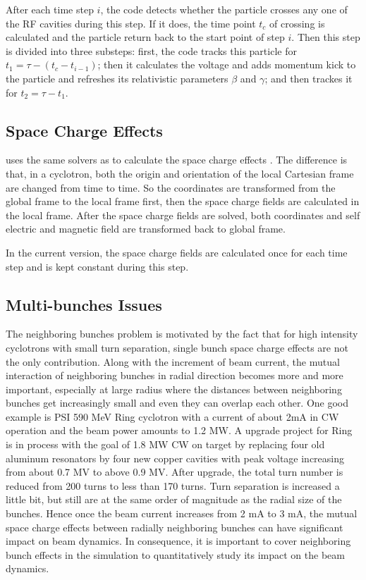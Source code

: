After each time step $i$, the code detects whether the particle crosses any one of the RF cavities during this step.
If it does, the time point $t_c$ of crossing is calculated and the particle return back to the start point of
step $i$. Then this step is divided into three substeps:
first, the code tracks this particle for $ t_1 = \tau - (t_c-t_{i-1})$;
then it calculates the voltage and adds momentum kick to the particle and refreshes its relativistic parameters $\beta$ and $\gamma$;
and then trackes it for $t_2 = \tau - t_1$.

\subsection{Space Charge Effects}

\opalcycl uses the same solvers as \opalt to calculate the space charge effects .
The difference is that, in a cyclotron,
both the origin and orientation of the local Cartesian frame are changed from time to time. So the coordinates are transformed from
the global frame to the local frame first, then the space charge fields are calculated in the local frame.
After the space charge fields are solved, both coordinates and self electric and magnetic field are transformed back to global frame.

In the current version, the space charge fields are calculated once for each time step and is kept constant during this step.

\subsection{Multi-bunches Issues}
\label{sec:opalcycl:MultiBunch}

The neighboring bunches problem is motivated by the fact that for high intensity cyclotrons with small turn
separation, single bunch space charge effects are not the only contribution. Along with the increment of beam
current, the mutual interaction of neighboring bunches in radial direction becomes more and more important,
especially at large radius where the distances between neighboring bunches get increasingly small and even they
can overlap each other. One good example is PSI 590 MeV Ring cyclotron with a current of about 2mA in
CW operation and the beam power amounts to 1.2 MW. A upgrade project for Ring is in process with
the goal of 1.8 MW CW on target by replacing four old aluminum resonators by four new copper cavities with peak
voltage increasing from about 0.7 MV to above 0.9 MV. After upgrade, the total turn
number is reduced from 200 turns to less than 170 turns.
Turn separation is increased a little bit, but still are at the same order
of magnitude as the radial size of the bunches. Hence once the beam current increases from 2 mA to 3 mA, the mutual space
charge effects between radially neighboring bunches can have significant impact on beam dynamics.
In consequence, it is important to cover neighboring bunch effects in the simulation to quantitatively study its impact on the beam dynamics.

